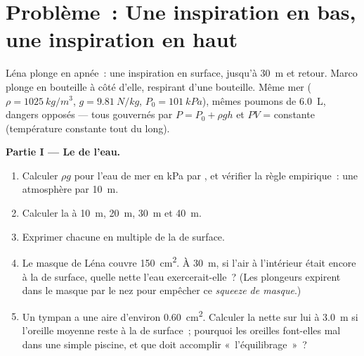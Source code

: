 \section{Problème~: Une inspiration en bas, une inspiration en haut}

\begin{problem}
\label{pb:g10:pressure:1}
Léna plonge en apnée~: une inspiration en surface, jusqu'à \qty{30}{m}
et retour. Marco plonge en bouteille à côté d'elle, respirant d'une
bouteille. Même mer ($\rho = \qty{1025}{kg/m^3}$,
$g = \qty{9.81}{N/kg}$, $P_0 = \qty{101}{kPa}$), mêmes poumons de
\qty{6.0}{L}, dangers opposés --- tous gouvernés par
$P = P_0 + \rho g h$ et $PV$ = constante (température constante tout
du long).

\medskip
\noindent\textbf{Partie I --- Le  de l'eau.}
\begin{enumerate}
  \item Calculer $\rho g$ pour l'eau de mer en \unit{kPa} par
        , et vérifier la règle empirique~: une
        atmosphère par \qty{10}{m}.
  \item Calculer la  à \qty{10}{m},
        \qty{20}{m}, \qty{30}{m} et \qty{40}{m}.
  \item Exprimer chacune en multiple de la
         de surface.
  \item Le masque de Léna couvre \qty{150}{cm^2}. À \qty{30}{m}, si
        l'air à l'intérieur était encore à la
         de surface, quelle 
        nette l'eau exercerait-elle~? (Les plongeurs expirent dans le
        masque par le nez pour empêcher ce \emph{squeeze de masque}.)
  \item Un tympan a une aire d'environ \qty{0.60}{cm^2}. Calculer la
         nette sur lui à \qty{3.0}{m} si l'oreille moyenne
        reste à la  de surface~; pourquoi les oreilles
        font-elles mal dans une simple piscine, et que doit accomplir
        «~l'équilibrage~»~?
\end{enumerate}


\end{problem}
